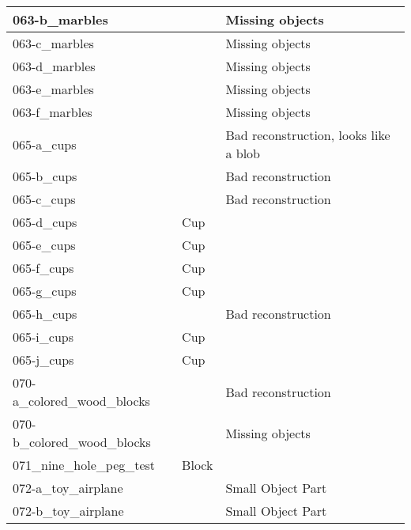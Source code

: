 \documentclass{article}
\begin{document}
\begin{longtable}{|l|l|l|}
063-b\_marbles               &                & Missing objects                       \\ \hline
063-c\_marbles               &                & Missing objects                       \\ \hline
063-d\_marbles               &                & Missing objects                       \\ \hline
063-e\_marbles               &                & Missing objects                       \\ \hline
063-f\_marbles               &                & Missing objects                       \\ \hline
065-a\_cups                  &                & Bad reconstruction, looks like a blob \\ \hline
065-b\_cups                  &                & Bad reconstruction                    \\ \hline
065-c\_cups                  &                & Bad reconstruction                    \\ \hline
065-d\_cups                  & Cup            &                                       \\ \hline
065-e\_cups                  & Cup            &                                       \\ \hline
065-f\_cups                  & Cup            &                                       \\ \hline
065-g\_cups                  & Cup            &                                       \\ \hline
065-h\_cups                  &                & Bad reconstruction                    \\ \hline
065-i\_cups                  & Cup            &                                       \\ \hline
065-j\_cups                  & Cup            &                                       \\ \hline
070-a\_colored\_wood\_blocks &                & Bad reconstruction                    \\ \hline
070-b\_colored\_wood\_blocks &                & Missing objects                       \\ \hline
071\_nine\_hole\_peg\_test   & Block          &                                       \\ \hline
072-a\_toy\_airplane         &                & Small Object Part                     \\ \hline
072-b\_toy\_airplane         &                & Small Object Part                     \\ \hline

\end{longtable}
\end{document}
